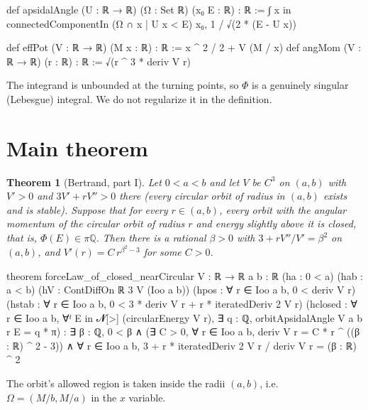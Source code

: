 \documentclass[11pt]{article}
\newtheorem{theorem}{Theorem}
\theoremstyle{remark}
\begin{document}
\begin{lean}
def apsidalAngle (U : ℝ → ℝ) (Ω : Set ℝ) (x₀ E : ℝ) : ℝ :=
  ∫ x in connectedComponentIn (Ω ∩ {x | U x < E}) x₀, 1 / √(2 * (E - U x))

def effPot (V : ℝ → ℝ) (M x : ℝ) : ℝ := x ^ 2 / 2 + V (M / x)
def angMom (V : ℝ → ℝ) (r : ℝ) : ℝ := √(r ^ 3 * deriv V r)
\end{lean}

The integrand is unbounded at the turning points, so $\Phi$ is a genuinely singular (Lebesgue)
integral. We do not regularize it in the definition.

\section{Main theorem}

\begin{theorem}[Bertrand, part I]\label{thm:main}
Let $0<a<b$ and let $V$ be $C^3$ on $(a,b)$ with $V'>0$ and $3V'+rV''>0$ there (every circular
orbit of radius in $(a,b)$ exists and is stable). Suppose that for every $r\in(a,b)$, every orbit
with the angular momentum of the circular orbit of radius $r$ and energy slightly above it is closed,
that is, $\Phi(E)\in\pi\mathbb{Q}$. Then there is a rational $\beta>0$ with $3+rV''/V'=\beta^2$ on
$(a,b)$, and $V'(r)=C\,r^{\beta^2-3}$ for some $C>0$.
\end{theorem}

\begin{lean}
theorem forceLaw_of_closed_nearCircular {V : ℝ → ℝ} {a b : ℝ} (ha : 0 < a) (hab : a < b)
    (hV : ContDiffOn ℝ 3 V (Ioo a b))
    (hpos : ∀ r ∈ Ioo a b, 0 < deriv V r)
    (hstab : ∀ r ∈ Ioo a b, 0 < 3 * deriv V r + r * iteratedDeriv 2 V r)
    (hclosed : ∀ r ∈ Ioo a b, ∀ᶠ E in 𝓝[>] (circularEnergy V r),
      ∃ q : ℚ, orbitApsidalAngle V a b r E = q * π) :
    ∃ β : ℚ, 0 < β ∧ (∃ C > 0, ∀ r ∈ Ioo a b, deriv V r = C * r ^ ((β : ℝ) ^ 2 - 3)) ∧
      ∀ r ∈ Ioo a b, 3 + r * iteratedDeriv 2 V r / deriv V r = (β : ℝ) ^ 2
\end{lean}

The orbit's allowed region is taken inside the radii $(a,b)$, i.e.\ $\Omega=(M/b,M/a)$ in the
$x$ variable.
\end{document}
